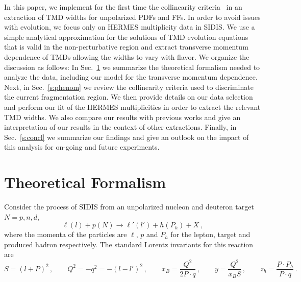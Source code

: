 \documentclass[final,3p,times,onecolumn,sort&compress,hidelinks]{elsarticle}
\newcommand{\xbj}{x_B}
\newcommand{\zh}{z_h}
\newcommand{\cbl}{\color{blue}}
\begin{document}
  
In this paper, we  implement for the first time the collinearity criteria~\cite{Boglione:2016bph} in an extraction of TMD widths for unpolarized PDFs and FFs.  In order to avoid issues with evolution, we focus only on HERMES multiplicity data in SIDIS.  We use a simple analytical approximation for the solutions of TMD evolution equations that is valid in the non-perturbative region and  extract transverse momentum dependence of TMDs allowing the widths to vary with flavor.
We organize the discussion as follows: In Sec.~\ref{s:model} we summarize the theoretical formalism needed to analyze the data, including our model for the transverse momentum dependence.  {\cbl Next, in Sec.~\ref{s:phenom} we review the collinearity criteria used to discriminate the current fragmentation region. We then provide details on our data selection and perform our} fit of the HERMES multiplicities in order to extract the relevant TMD widths.  We also compare our results with previous works and give an interpretation of our results in the context of  other extractions.  Finally, in Sec.~\ref{s:concl} we summarize our findings and give an outlook on the impact of this analysis for on-going and future experiments.



\section{Theoretical Formalism}
\label{s:model}
Consider the process of SIDIS from an unpolarized nucleon and deuteron target $N=p,n,d$,
\begin{equation}
\ell(l)+p(N)\to \ell'(l') + h(P_h) + X\,,
\end{equation}
where the momenta of the particles are  $\ell$, $p$ and $P_h$ for the lepton, target and produced hadron respectively.
 The standard Lorentz invariants for this reaction are
\begin{equation}
  S = (l+P)^2\,, \quad\quad Q^2 = -q^2 = -(l-l')^2\,, \quad\quad \xbj = \frac{Q^2} {2P\cdot q}\,, \quad\quad y = \frac{Q^2} {\xbj S}\,, \quad\quad
  \zh = \frac{P\cdot P_h} {P\cdot q}\,.
\end{equation}
\end{document}
